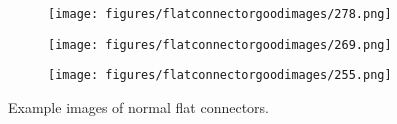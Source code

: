\begin{figure}[htbp]
    \captionsetup[subfigure]{justification=centering}
    \centering
    \begin{subfigure}[b]{0.25\textwidth} %
        \centering
        \texttt{[image: figures/flatconnectorgoodimages/278.png]}
    \end{subfigure}
    \hspace{0.05\textwidth} %
    \begin{subfigure}[b]{0.25\textwidth} %
        \centering
        \texttt{[image: figures/flatconnectorgoodimages/269.png]}
    \end{subfigure}
    \hspace{0.05\textwidth} %
    \begin{subfigure}[b]{0.25\textwidth} %
        \centering
        \texttt{[image: figures/flatconnectorgoodimages/255.png]}
    \end{subfigure}
    \caption{Example images of normal flat connectors.}
    \label{fig:flatgoodimages}
\end{figure}